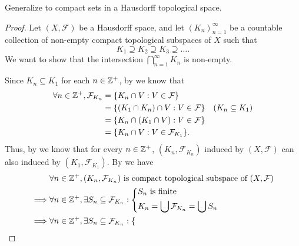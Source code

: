 \begin{ex}\label{ii:ex:2.5.13}
  Generalize  to compact sets in a Hausdorff topological space.
\end{ex}

\begin{proof}
  Let \((X, \mathcal{F})\) be a Hausdorff space, and let \((K_n)_{n = 1}^\infty\) be a countable collection of non-empty compact topological subspaces of \(X\) such that
  \[
    K_1 \supseteq K_2 \supseteq K_3 \supseteq \dots.
  \]
  We want to show that the intersection \(\bigcap_{n = 1}^\infty K_n\) is non-empty.

  Since \(K_n \subseteq K_1\) for each \(n \in \mathbb{Z}^+\), by  we know that
  \begin{align*}
    \forall n \in \Z^+, \mathcal{F}_{K_n} & = \set{K_n \cap V : V \in \mathcal{F}}                                  \\
                                          & = \set{(K_1 \cap K_n) \cap V : V \in \mathcal{F}} & (K_n \subseteq K_1) \\
                                          & = \set{K_n \cap (K_1 \cap V) : V \in \mathcal{F}}                       \\
                                          & = \set{K_n \cap V : V \in \mathcal{F}_{K_1}}.
  \end{align*}
  Thus, by  we know that for every \(n \in \mathbb{Z}^+\), \((K_n, \mathcal{F}_{K_n})\) induced by \((X, \mathcal{F})\) can also induced by \((K_1, \mathcal{F}_{K_1})\).
  By  we have
  \begin{align*}
             & \forall n \in \Z^+, (K_n, \mathcal{F}_{K_n}) \text{ is compact topological subspace of } (X, \mathcal{F})                                                               \\
    \implies & \forall n \in \Z^+, \exists S_n \subseteq \mathcal{F}_{K_n} : \begin{dcases}
                                                                               S_n \text{ is finite} \\
                                                                               K_n = \bigcup \mathcal{F}_{K_n} = \bigcup S_n
                                                                             \end{dcases}                                                              \\
    \implies & \forall n \in \Z^+, \exists S_n \subseteq \mathcal{F}_{K_n} : \begin{dcases}

\end{dcases}
\end{align*}
\end{proof}
